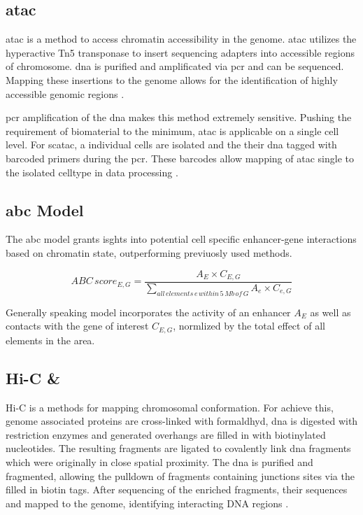     \subsection{\ac{atac}}
    \ac{atac} is a method to access chromatin accessibility in the genome. \Ac{atac} utilizes the hyperactive Tn5 transponase to insert sequencing adapters into accessible regions of chromosome. \ac{dna} is purified and amplificated via \ac{pcr} and can be sequenced. Mapping these insertions to the genome allows for the identification of highly accessible genomic regions \cite{buenrostroTranspositionNativeChromatin2013, buenrostroATACseqMethodAssaying2015}.

    \ac{pcr} amplification of the \ac{dna} makes this method extremely sensitive. Pushing the requirement of biomaterial to the minimum, \ac{atac} is applicable on a single cell level. For sc\ac{atac}, a individual cells are isolated and the their \ac{dna} tagged with barcoded primers during the \ac{pcr}. These barcodes allow mapping of \ac{atac} single to the isolated celltype in data processing \cite{buenrostroSinglecellChromatinAccessibility2015}.

    \subsection{\acs{abc}  Model}
    \cite{fulcoActivitybycontactModelEnhancer2019a, nasserGenomewideEnhancerMaps2021a}
    The \acf{abc} model grants isghts into potential cell specific enhancer-gene interactions based on chromatin state, outperforming previuosly used methods.

    $$ ABC\,score_{E, G} = \frac{A_E \times C_{E,G}}{\sum\limits_{all\,elements\,e\,within\,5\,Mb\,of\,G} A_e \times C_{e, G}} $$

    Generally speaking model incorporates the activity of an enhancer $A_E$ as well as contacts with the gene of interest $C_{E,G}$, normlized by the total effect of all elements in the area.

    \subsection{Hi-C \& }
    Hi-C is a methods for mapping chromosomal conformation. For achieve this, genome associated proteins are cross-linked with formaldhyd, \ac{dna} is digested with restriction enzymes and generated overhangs are filled in with biotinylated nucleotides. The resulting fragments are ligated to covalently link \ac{dna} fragments which were originally in close spatial proximity. The \ac{dna} is purified and fragmented, allowing the pulldown of fragments containing junctions sites via the filled in biotin tags. After sequencing of the enriched fragments, their sequences and mapped to the genome, identifying interacting DNA regions \cite{lieberman-aidenComprehensiveMappingLongRange2009, witDecade3CTechnologies2012}.

